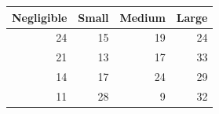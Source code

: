 \begin{tabular}{rrrr}
\toprule
Negligible & Small & Medium & Large \\
\midrule
24 & 15 & 19 & 24 \\
21 & 13 & 17 & 33 \\
14 & 17 & 24 & 29 \\
11 & 28 & 9 & 32 \\
\bottomrule
\end{tabular}
